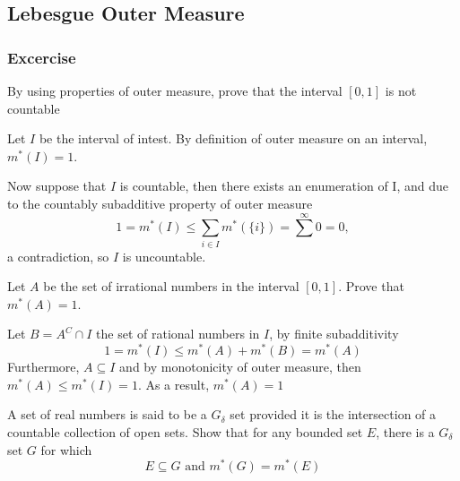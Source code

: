 \subsection{Lebesgue Outer Measure}

\subsubsection{Excercise}

\begin{exercise}{5}
    By using properties of outer measure, prove that the interval $[0, 1]$ is not countable
\end{exercise}

\begin{solution}
    Let $I$ be the interval of intest. By definition of outer measure on an interval, $m^*(I)=1$.

    Now suppose that $I$ is countable, then there exists an enumeration of I, and due to the countably subadditive property of outer measure
    \begin{equation*}
        1=m^*(I) \leq \sum_{i \in I} m^* (\{i\}) = \sum^\infty 0 = 0,
    \end{equation*}
    a contradiction, so $I$ is uncountable.
\end{solution}

\begin{exercise}{6}
    Let $A$ be the set of irrational numbers in the interval $[0,1]$. Prove that $m^*(A)=1$.
\end{exercise}
\begin{solution}
    Let $B = A^C \cap I$ the set of rational numbers in $I$, by finite subadditivity
    \begin{equation*}
        1=m^*(I) \leq m^*(A) + m^*(B) = m^*(A)
    \end{equation*}
    Furthermore, $A\subseteq I$ and by monotonicity of outer measure, then $m^*(A) \leq m^*(I)=1$. As a result, $m^*(A)=1$ 
\end{solution}

\begin{exercise}{7}
    A set of real numbers is said to be a $G_\delta$ set provided it is the intersection of a countable
    collection of open sets. Show that for any bounded set $E$, there is a $G_\delta$ set $G$ for which 
    \begin{equation*}
        E \subseteq G \text{ and } m^*(G) = m^*(E)
    \end{equation*}
\end{exercise}

